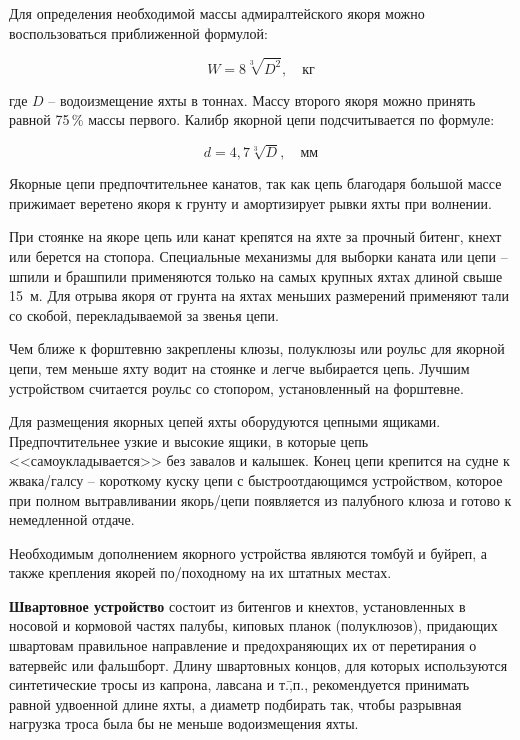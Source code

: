 \documentclass[a4paper, 12pt, twoside, final, book, russian, fittopage, cyremdash]{ncc}
\begin{document}
Для определения необходимой массы адмиралтейского якоря можно воспользоваться приближенной формулой:

\begin{equation}
  W = 8 \sqrt[3]{D^2}, \quad \text{кг}
\end{equation}

где $D$ \--- водоизмещение яхты в тоннах. Массу второго якоря можно принять равной 75\,\% массы первого. Калибр якорной цепи подсчитывается по формуле: 

\begin{equation}
  d = 4,7 \sqrt[3]{D}, \quad \text{мм}
\end{equation}

Якорные цепи предпочтительнее канатов, так как цепь благодаря большой массе прижимает веретено якоря к грунту и амортизирует рывки яхты при волнении. 

При стоянке на якоре цепь или канат крепятся на яхте за прочный битенг, кнехт или берется на стопора. Специальные механизмы для выборки каната или цепи \--- шпили и брашпили применяются только на самых крупных яхтах длиной свыше 15~м. Для отрыва якоря от грунта на яхтах меньших размерений применяют тали со скобой, перекладываемой за звенья цепи.

Чем ближе к форштевню закреплены клюзы, полуклюзы или роульс для якорной цепи, тем меньше яхту водит на стоянке и легче выбирается цепь. Лучшим устройством считается роульс со стопором, установленный на форштевне.

Для размещения якорных цепей яхты оборудуются цепными ящиками. Предпочтительнее узкие и высокие ящики, в которые цепь <<самоукладывается>> без завалов и калышек. Конец цепи крепится на судне к жвака\-/галсу \--- короткому куску цепи с быстроотдающимся устройством, которое при полном вытравливании якорь\-/цепи появляется из палубного клюза и готово к немедленной отдаче. 

Необходимым дополнением якорного устройства являются томбуй и буйреп, а также крепления якорей по\-/походному на их штатных местах. 

\textbf{Швартовное устройство} состоит из битенгов и кнехтов, установленных в носовой и кормовой частях палубы, киповых планок (полуклюзов), придающих швартовам правильное направление и предохраняющих их от перетирания о ватервейс или фальшборт. Длину швартовных концов, для которых используются синтетические тросы из капрона, лавсана и т.\=,п., рекомендуется принимать равной удвоенной длине яхты, а диаметр подбирать так, чтобы разрывная нагрузка троса была бы не меньше водоизмещения яхты. 
\end{document}
